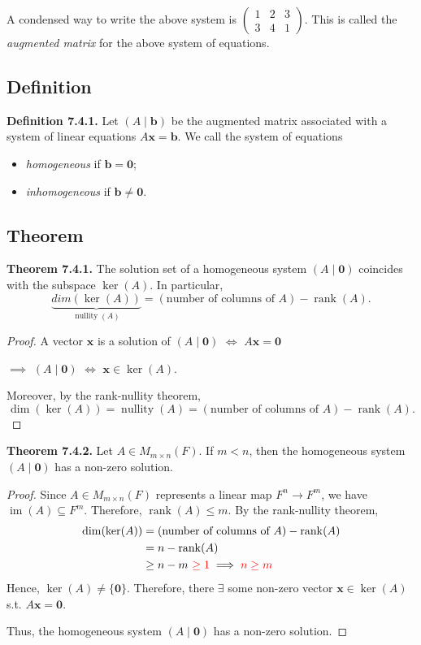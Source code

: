 \documentclass[12pt]{article}
\begin{document}
A condensed way to write the above system is
$\left(
\begin{array}{cc|c}
1 & 2 & 3\\
3 & 4 & 1
\end{array}
\right).$ This is called the \emph{augmented matrix} for the above system of equations.

\subsection{Definition}

\textbf{Definition 7.4.1.}
Let $(A\mid \mathbf{b})$ be the augmented matrix associated with a system
of linear equations $A\mathbf{x}=\mathbf{b}$. We call the system of equations
\begin{itemize}
    \item \emph{homogeneous} if $\mathbf{b}=\mathbf{0}$;
    \item \emph{inhomogeneous} if $\mathbf{b}\neq\mathbf{0}$.
\end{itemize}

\subsection{Theorem}

\textbf{Theorem 7.4.1.}
The solution set of a homogeneous system $(A\mid \mathbf{0})$ coincides
with the subspace $\ker(A)$. In particular,
\[
\underbrace{dim(\ker(A))}_{\operatorname{nullity}(A)}=(\text{number of columns of }A)-\operatorname{rank}(A).
\]

\begin{proof}
A vector $\mathbf{x}$ is a solution of $(A\mid\mathbf{0})$ $\Leftrightarrow$ $A\mathbf{x}=\mathbf{0}$

$\implies$ $(A\mid\mathbf{0})$ $\Leftrightarrow$ $\mathbf{x}\in\ker(A)$.

Moreover, by the rank-nullity theorem,
\[
\dim(\ker(A))=\operatorname{nullity}(A)=(\text{number of columns of }A)-\operatorname{rank}(A).
\]
\end{proof}

\textbf{Theorem 7.4.2.}
Let $A\in M_{m\times n}(F)$. If $m<n$, then the homogeneous system
$(A\mid\mathbf{0})$ has a non-zero solution.

\begin{proof}
Since $A\in M_{m\times n}(F)$ represents a linear map $F^n \longrightarrow F^m$,
we have $\operatorname{im}(A)\subseteq F^m$. Therefore, $\operatorname{rank}(A)\leq m$.
By the rank-nullity theorem,
\begin{align*}
\dim(\ker(A))
&=(\text{number of columns of }A)-\operatorname{rank}(A)\\
&=n-\operatorname{rank}(A)\\
&\geq n-m \textcolor{red}{\text{ $\geq 1$}} \implies \textcolor{red}{\text{$n \geq m$}}
\end{align*}
Hence, $\ker(A)\neq\{\mathbf{0}\}$. Therefore, there $\exists$ some non-zero vector $\mathbf{x}\in\ker(A)$
s.t. $A\mathbf{x}=\mathbf{0}$.

Thus, the homogeneous system $(A\mid\mathbf{0})$ has a non-zero solution.
\end{proof}
\end{document}
